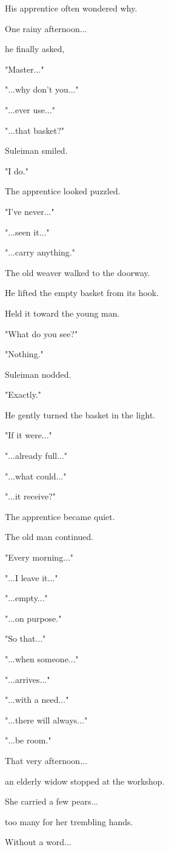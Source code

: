 \documentclass[12pt,openany]{book}
\begin{document}
His apprentice often wondered why.

One rainy afternoon...

he finally asked,

"Master..."

"...why don't you..."

"...ever use..."

"...that basket?"

Suleiman smiled.

"I do."

The apprentice looked puzzled.

"I've never..."

"...seen it..."

"...carry anything."

The old weaver walked to the doorway.

He lifted the empty basket from its hook.

Held it toward the young man.

"What do you see?"

"Nothing."

Suleiman nodded.

"Exactly."

He gently turned the basket in the light.

"If it were..."

"...already full..."

"...what could..."

"...it receive?"

The apprentice became quiet.

The old man continued.

"Every morning..."

"...I leave it..."

"...empty..."

"...on purpose."

"So that..."

"...when someone..."

"...arrives..."

"...with a need..."

"...there will always..."

"...be room."

That very afternoon...

an elderly widow stopped at the workshop.

She carried a few pears...

too many for her trembling hands.

Without a word...
\end{document}
